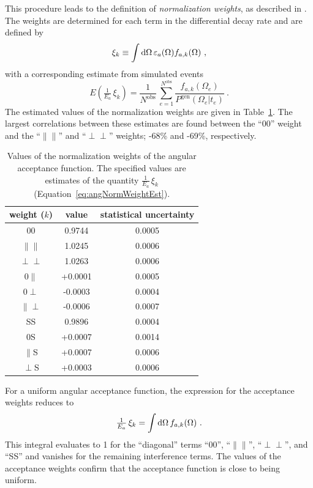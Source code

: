 This procedure leads to the definition of \emph{normalization weights}, as described in \cite{duPree:2010}. The weights are determined for
each term in the differential decay rate and are defined by
\begin{equation}
  \label{eq:angNormWeightDef}
  \xi_k \equiv \int\mathrm{d}\Omega\, \varepsilon_a(\Omega) f_{a,k}(\Omega)\ ,
\end{equation}
with a corresponding estimate from simulated events
\begin{equation}
  \label{eq:angNormWeightEst}
  E\left( \tfrac{1}{E_a}\, \xi_k \right)
      = \frac{1}{N^\text{obs}}\, \sum_{e=1}^{N^\text{obs}}\frac{f_{a,k}(\Omega_e)}{P^\text{gen}(\Omega_e|t_e)}\ .
\end{equation}
The estimated values of the normalization weights are given in Table~\ref{tab:angNormWeights}. The largest correlations between these
estimates are found between the ``00'' weight and the ``$\parallel\parallel$'' and ``$\perp\perp$'' weights; -68\% and -69\%, respectively.
\begin{table}[htbp]
  \centering
  \caption{Values of the normalization weights of the angular acceptance function.
           The specified values are estimates of the quantity $\tfrac{1}{E_a}\, \xi_k$ (Equation~\ref{eq:angNormWeightEst}).}
  \label{tab:angNormWeights}
  \begin{tabular}{ccc}
    \hline
    weight ($k$)  &  value  &  statistical uncertainty  \\
    \hline
    00                    &  0.9744   &  0.0005  \\
    $\parallel\parallel$  &  1.0245   &  0.0006  \\
    $\perp\perp$          &  1.0263   &  0.0006  \\
    0$\parallel$          &  +0.0001  &  0.0005  \\
    0$\perp$              &  -0.0003  &  0.0004  \\
    $\parallel\perp$      &  -0.0006  &  0.0007  \\
    SS                    &  0.9896   &  0.0004  \\
    0S                    &  +0.0007  &  0.0014  \\
    $\parallel$S          &  +0.0007  &  0.0006  \\
    $\perp$S              &  +0.0003  &  0.0006  \\
    \hline
  \end{tabular}
\end{table}

For a uniform angular acceptance function, the expression for the acceptance weights reduces to
\begin{equation}
  \tfrac{1}{E_a}\, \xi_k = \int\mathrm{d}\Omega\,f_{a,k}(\Omega)\ .
\end{equation}
This integral evaluates to 1 for the ``diagonal'' terms ``00'', ``$\parallel\parallel$'', ``$\perp\perp$'', and ``SS'' and vanishes for the
remaining interference terms. The values of the acceptance weights confirm that the acceptance function is close to being uniform.

